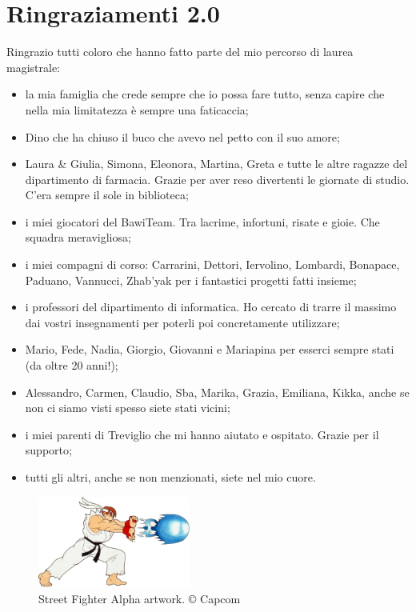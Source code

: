 %
%
\chapter*{Ringraziamenti 2.0}

Ringrazio tutti coloro che hanno fatto parte del mio percorso di laurea magistrale:
\begin{itemize}
	\item la mia famiglia che crede sempre che io possa fare tutto, senza capire che nella mia limitatezza è sempre una faticaccia;	
	\item Dino che ha chiuso il buco che avevo nel petto con il suo amore;
	\item Laura \& Giulia, Simona, Eleonora, Martina, Greta e tutte le altre ragazze del dipartimento di farmacia. Grazie per aver reso divertenti le giornate di studio. C'era sempre il sole in biblioteca;
	\item i miei giocatori del BawiTeam. Tra lacrime, infortuni, risate e gioie. Che squadra meravigliosa;
	\item i miei compagni di corso: Carrarini, Dettori, Iervolino, Lombardi, Bonapace, Paduano, Vannucci, Zhab'yak per i fantastici progetti fatti insieme;
	\item i professori del dipartimento di informatica. Ho cercato di trarre il massimo dai vostri insegnamenti per poterli poi concretamente utilizzare;
	\item Mario, Fede, Nadia, Giorgio, Giovanni e Mariapina per esserci sempre stati (da oltre 20 anni!);
	\item Alessandro, Carmen, Claudio, Sba, Marika, Grazia, Emiliana, Kikka, anche se non ci siamo visti spesso siete stati vicini;	
	\item i miei parenti di Treviglio che mi hanno aiutato e ospitato. Grazie per il supporto;
	\item tutti gli altri, anche se non menzionati, siete nel mio cuore.
\end{itemize}

\vspace*{\fill}

\begin{figure}[H]
	\centering
	\includegraphics[width=5cm]{immagini/hadoken}
	\caption{Street Fighter Alpha artwork. © Capcom}
	\label{fig:hadoken}
\end{figure}
